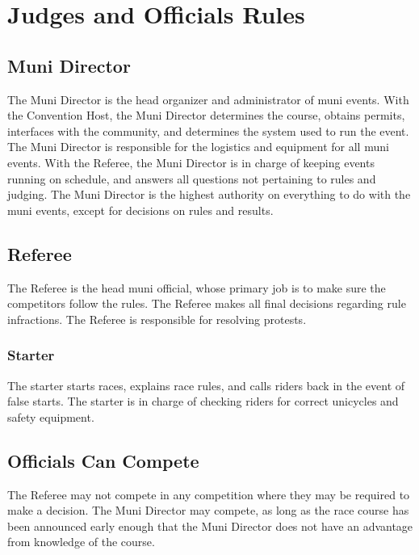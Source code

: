 \chapter{Judges and Officials Rules}

\section{Muni Director}

The Muni Director is the head organizer and administrator of muni events.
With the Convention Host, the Muni Director determines the course, obtains permits, interfaces with the community, and determines the system used to run the event.
The Muni Director is responsible for the logistics and equipment for all muni events.
With the Referee, the Muni Director is in charge of keeping events running on schedule, and answers all questions not pertaining to rules and judging.
The Muni Director is the highest authority on everything to do with the muni events, except for decisions on rules and results.

\section{Referee}

The Referee is the head muni official, whose primary job is to make sure the competitors follow the rules.
The Referee makes all final decisions regarding rule infractions.
The Referee is responsible for resolving protests.

\subsection{Starter}

The starter starts races, explains race rules, and calls riders back in the event of false starts.
The starter is in charge of checking riders for correct unicycles and safety equipment.

\section{Officials Can Compete}

The Referee may not compete in any competition where they may be required to make a decision.
The Muni Director may compete, as long as the race course has been announced early enough that the Muni Director does not have an advantage from knowledge of the course.
